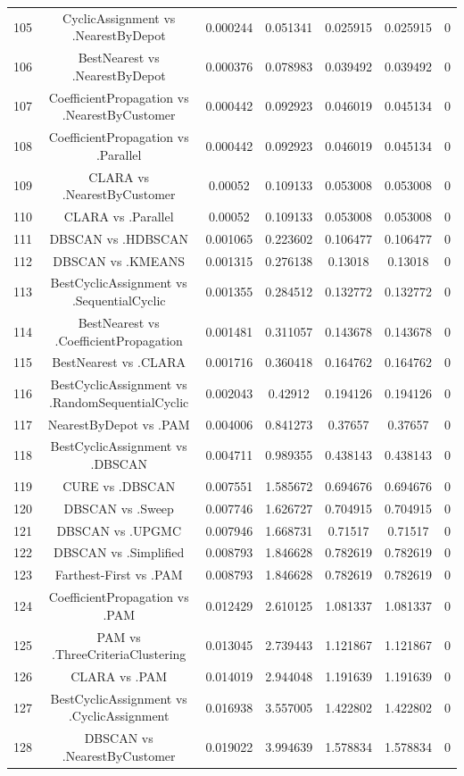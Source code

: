 \documentclass[a4paper,10pt]{article}
\begin{document}
\begin{landscape}
\begin{table}[!htp]
\begin{tabular}{ccccccc}
105&CyclicAssignment vs .NearestByDepot&0.000244&0.051341&0.025915&0.025915&0\\
106&BestNearest vs .NearestByDepot&0.000376&0.078983&0.039492&0.039492&0\\
107&CoefficientPropagation vs .NearestByCustomer&0.000442&0.092923&0.046019&0.045134&0\\
108&CoefficientPropagation vs .Parallel&0.000442&0.092923&0.046019&0.045134&0\\
109&CLARA vs .NearestByCustomer&0.00052&0.109133&0.053008&0.053008&0\\
110&CLARA vs .Parallel&0.00052&0.109133&0.053008&0.053008&0\\
111&DBSCAN vs .HDBSCAN&0.001065&0.223602&0.106477&0.106477&0\\
112&DBSCAN vs .KMEANS&0.001315&0.276138&0.13018&0.13018&0\\
113&BestCyclicAssignment vs .SequentialCyclic&0.001355&0.284512&0.132772&0.132772&0\\
114&BestNearest vs .CoefficientPropagation&0.001481&0.311057&0.143678&0.143678&0\\
115&BestNearest vs .CLARA&0.001716&0.360418&0.164762&0.164762&0\\
116&BestCyclicAssignment vs .RandomSequentialCyclic&0.002043&0.42912&0.194126&0.194126&0\\
117&NearestByDepot vs .PAM&0.004006&0.841273&0.37657&0.37657&0\\
118&BestCyclicAssignment vs .DBSCAN&0.004711&0.989355&0.438143&0.438143&0\\
119&CURE vs .DBSCAN&0.007551&1.585672&0.694676&0.694676&0\\
120&DBSCAN vs .Sweep&0.007746&1.626727&0.704915&0.704915&0\\
121&DBSCAN vs .UPGMC&0.007946&1.668731&0.71517&0.71517&0\\
122&DBSCAN vs .Simplified&0.008793&1.846628&0.782619&0.782619&0\\
123&Farthest-First vs .PAM&0.008793&1.846628&0.782619&0.782619&0\\
124&CoefficientPropagation vs .PAM&0.012429&2.610125&1.081337&1.081337&0\\
125&PAM vs .ThreeCriteriaClustering&0.013045&2.739443&1.121867&1.121867&0\\
126&CLARA vs .PAM&0.014019&2.944048&1.191639&1.191639&0\\
127&BestCyclicAssignment vs .CyclicAssignment&0.016938&3.557005&1.422802&1.422802&0\\
128&DBSCAN vs .NearestByCustomer&0.019022&3.994639&1.578834&1.578834&0\\

\end{tabular}
\end{table}
\end{landscape}
\end{document}
